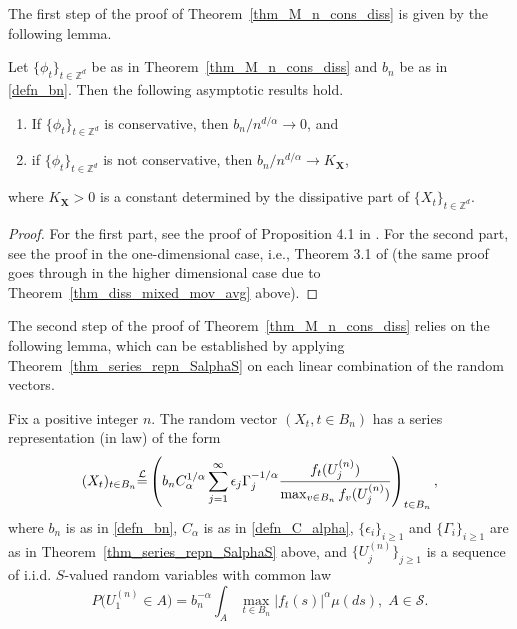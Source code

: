 \documentclass[12pt]{amsart}
\begin{document}
The first step of the proof of Theorem~\ref{thm_M_n_cons_diss} is given by the following lemma.

\begin{lemma} \label{lemma_asymp_of_bn} Let ${\{\phi_t\}_{t \in \mathbb{Z}^d}}$ be as in Theorem~\ref{thm_M_n_cons_diss} and $b_n$ be as in \eqref{defn_bn}. Then the following asymptotic results hold.
\begin{enumerate}
\item If ${\{\phi_t\}_{t \in \mathbb{Z}^d}}$ is conservative, then $b_n / n^{d/\alpha} \to 0$, and
\item if ${\{\phi_t\}_{t \in \mathbb{Z}^d}}$ is not conservative, then $b_n / n^{d/\alpha} \to K_{\mathbf{X}}$,
\end{enumerate}
where $K_{\mathbf{X}} >0$ is a constant determined by the dissipative part of ${\{X_t\}_{t \in \mathbb{Z}^d}}$.
\end{lemma}

\begin{proof} For the first part, see the proof of Proposition 4.1 in \cite{roy:samorodnitsky:2008}. For the second part, see the proof in the one-dimensional case, i.e., Theorem 3.1 of \cite{samorodnitsky:2004a} (the same proof goes through in the higher dimensional case due to Theorem~\ref{thm_diss_mixed_mov_avg} above).
\end{proof}

The second step of the proof of Theorem~\ref{thm_M_n_cons_diss} relies on the following lemma, which can be established by applying Theorem~\ref{thm_series_repn_SalphaS} on each linear combination of the random vectors.

\begin{lemma} \label{lemma_series_repn} Fix a positive integer $n$. The random vector $(X_t, t \in B_n)$ has a series representation (in law) of the form
\[
(X_t)_{t \in B_n} {\stackrel{\footnotesize{\mathcal{L}}}{=}} \left(b_n C_\alpha^{1/\alpha} \sum_{j=1}^\infty \epsilon_j \Gamma_j^{-1/\alpha} \frac{f_t(U^{(n)}_j)}{\max_{ v \in B_n} f_v(U^{(n)}_j)}\right)_{t \in B_n},
\]
where $b_n$ is as in \eqref{defn_bn}, $C_\alpha$ is as in \eqref{defn_C_alpha}, $\{\epsilon_i\}_{i \geq 1}$ and $\{\Gamma_i\}_{i \geq 1}$ are as in Theorem~\ref{thm_series_repn_SalphaS} above, and $\{U^{(n)}_j\}_{j \geq 1}$ is a sequence of i.i.d. $S$-valued random variables with common law
\[
P\big(U^{(n)}_1 \in A\big)= b_n^{-\alpha} \int_A \max_{t \in B_n} |f_t(s)|^\alpha \mu(ds), \;A \in \mathcal{S}.
\]
\end{lemma}
\end{document}
